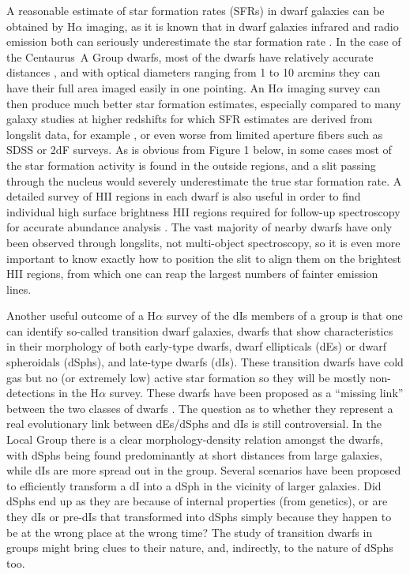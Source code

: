 \documentclass[preprint]{aastex}
\begin{document}
A reasonable estimate of star formation rates (SFRs) in dwarf galaxies can be 
obtained by H$\alpha $ imaging, as it is known that in dwarf galaxies 
infrared and radio emission both can seriously underestimate the star formation rate
\citep[e.g.,][]{b03}. In the case of the Centaurus~A Group dwarfs, 
most of the dwarfs have relatively accurate distances \citep[e.g.,][with distances 
determined via the tip of the red giant branch method with errors typically of $\sim $0.5 Mpc]{k02}, 
and with optical diameters ranging from 1 to 10 arcmins 
they can have their full area imaged easily in one pointing.
An H$\alpha$ imaging survey can then produce much better star formation estimates,
especially compared to many galaxy studies at higher redshifts for which 
SFR estimates are derived from longslit data, for example \citep{bal97}, or even worse from
limited aperture fibers such as SDSS or 2dF surveys. As is obvious from
Figure 1 below, in some cases most of the star formation activity is found
in the outside regions, and a slit passing through the nucleus would severely
underestimate the true star formation rate. A detailed survey of HII regions
in each dwarf is also useful in order to find individual high surface brightness HII
regions required for follow-up spectroscopy for accurate abundance analysis 
\citep[e.g.,][]{scm03a, scm03b}. The vast majority of nearby dwarfs have only been
observed through longslits, not multi-object spectroscopy, so it is even more important
to know exactly how to position the slit to align them on the brightest HII regions,
from which one can reap the largest numbers of fainter emission lines.

Another useful outcome of a H$\alpha$ survey of the dIs members of a group is that 
one can identify so-called transition
dwarf galaxies, dwarfs that show characteristics in their morphology of both 
early-type dwarfs, dwarf ellipticals (dEs) or dwarf spheroidals (dSphs), and
late-type dwarfs (dIs). These transition dwarfs have cold gas but no (or extremely low) active
star formation so they will be mostly non-detections in the H$\alpha$ survey. These 
dwarfs have been proposed as a ``missing link'' between the two classes of dwarfs \citep[e.g.,][]{ggh03}.
The question as to whether they represent a real evolutionary link between 
dEs/dSphs and dIs is still controversial. In the Local Group there is a clear
morphology-density relation amongst the dwarfs, with dSphs being found predominantly
at short distances from large galaxies, while dIs are more spread out in the group.
Several scenarios have been proposed to efficiently transform a dI into a dSph
in the vicinity of larger galaxies. Did dSphs end up as they are
because of internal properties (from genetics), 
or are they dIs or pre-dIs that transformed into
dSphs simply because they happen to be at the wrong place at the wrong time? 
The study of transition dwarfs in groups might bring clues to their nature, 
and, indirectly, to the nature of dSphs too.
\end{document}
